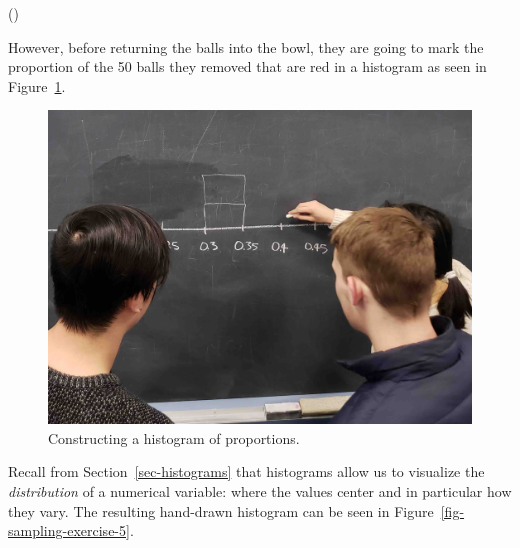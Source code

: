 \documentclass[
  letterpaper,
  DIV=11,
  numbers=noendperiod]{scrreprt}
\theoremstyle{definition}
\theoremstyle{remark}
\begin{document}
\begin{longtable}[]
\bottomrule()
\end{longtable}

However, before returning the balls into the bowl, they are going to
mark the proportion of the 50 balls they removed that are red in a
histogram as seen in Figure~\ref{fig-sampling-exercise-4}.

\begin{figure}

{\centering \includegraphics{images/sampling/tactile_3_a.jpg}

}

\caption{\label{fig-sampling-exercise-4}Constructing a histogram of
proportions.}

\end{figure}

Recall from Section~\ref{sec-histograms} that histograms allow us to
visualize the \emph{distribution} of a numerical variable: where the
values center and in particular how they vary. The resulting hand-drawn
histogram can be seen in Figure~\ref{fig-sampling-exercise-5}.
\end{document}
